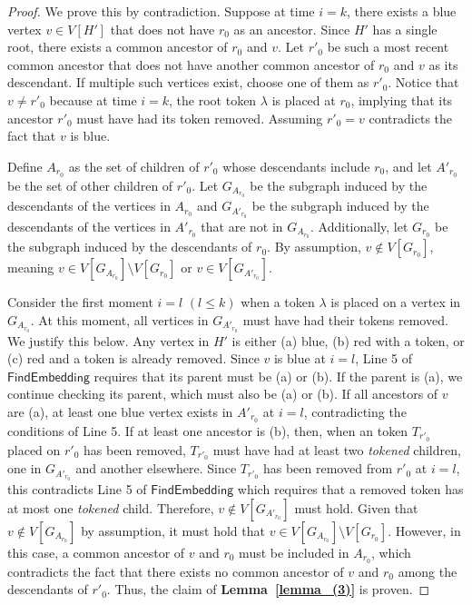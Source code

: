\documentclass[runningheads]{llncs}
\theoremstyle{plain}
\theoremstyle{definition}
\begin{document}
\begin{proof}
    We prove this by contradiction. Suppose at time $i = k$, there exists a blue vertex $v \in V[H']$ that does not have $r_0$ as an ancestor. Since $H'$ has a single root, there exists a common ancestor of $r_0$ and $v$. Let $r'_0$ be such a most recent common ancestor that does not have another common ancestor of $r_0$ and $v$ as its descendant. If multiple such vertices exist, choose one of them as $r'_0$. Notice that $v \neq r'_0$ because at time $i = k$, the root token $\lambda$ is placed at $r_0$, implying that its ancestor $r'_0$ must have had its token removed. Assuming $r'_0 = v$ contradicts the fact that $v$ is blue.
    
    Define $A_{r_0}$ as the set of children of $r'_0$ whose descendants include $r_0$, and let $A'_{r_0}$ be the set of other children of $r'_0$. Let $G_{A_{r_0}}$ be the subgraph induced by the descendants of the vertices in $A_{r_0}$ and $G_{A'_{r_0}}$ be the subgraph induced by the descendants of the vertices in $A'_{r_0}$ that are not in $G_{A_{r_0}}$. Additionally, let $G_{r_0}$ be the subgraph induced by the descendants of $r_0$. By assumption, $v \notin V[G_{r_0}]$, meaning $v \in V[G_{A_{r_0}}] \setminus V[G_{r_0}]$ or $v \in V[G_{A'_{r_0}}]$.
    
    Consider the first moment $i = l$ $(l \leq k)$ when a token $\lambda$ is placed on a vertex in $G_{A_{r_0}}$. At this moment, all vertices in $G_{A'_{r_0}}$ must have had their tokens removed. We justify this below. Any vertex in $H'$ is either (a) blue, (b) red with a token, or (c) red and a token is already removed. Since $v$ is blue at $i = l$, Line 5 of $\mathsf{FindEmbedding}$ requires that its parent must be (a) or (b). If the parent is (a), we continue checking its parent, which must also be (a) or (b). If all ancestors of $v$ are (a), at least one blue vertex exists in $A'_{r_0}$ at $i = l$, contradicting the conditions of Line 5. If at least one ancestor is (b), then, when an token $T_{r'_0}$ placed on $r'_0$ has been removed, $T_{r'_0}$ must have had at least two \textit{tokened} children, one in $G_{A'_{r_0}}$ and another elsewhere. Since $T_{r'_0}$ has been removed from $r'_0$ at $i = l$, this contradicts Line 5 of $\mathsf{FindEmbedding}$ which requires that a removed token has at most one \textit{tokened} child. Therefore, $v \notin V[G_{A'_{r_0}}]$ must hold. Given that $v \notin V[G_{A_{r_0}}]$ by assumption, it must hold that $v \in V[G_{A_{r_0}}] \setminus V[G_{r_0}]$. However, in this case, a common ancestor of $v$ and $r_0$ must be included in $A_{r_0}$, which contradicts the fact that there exists no common ancestor of $v$ and $r_0$ among the descendants of $r'_0$. Thus, the claim of \textbf{Lemma~\ref{lemma_(3)}} is proven.
\end{proof}
\end{document}
